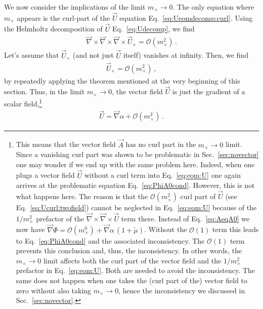 \documentclass[reprint, amsmath,amssymb, nofootinbib, aps, prd]{revtex4-2}
\begin{document}
We now consider the implications of the limit $m_\times \to 0$.
The only equation where $m_\times$ appears is the curl-part of the $\vec{U}$ equation Eq.~\eqref{eq:Ueomdecomp:curl}.
Using the Helmholtz decomposition of $\vec{U}$ Eq.~\eqref{eq:Udecomp}, we find
\begin{align}
 \vec{\nabla} \times \vec{\nabla} \times \vec{\nabla} \times \vec{U}_\times = \mathcal{O}(m_\times^2) \,.
\end{align}
Let's assume that $\vec{U}_\times$ (and not just $\vec{U}$ itself) vanishes at infinity.
Then, we find
\begin{align}
 \label{eq:Ucurl:twofield}
 \vec{U}_\times = \mathcal{O}(m_\times^2) \,,
\end{align}
by repeatedly applying the theorem mentioned at the very beginning of this section.
Thus, in the limit $m_\times \to 0$, the vector field $\vec{U}$ is just the gradient of a scalar field,\footnote{
  This means that the vector field $\vec{A}$ has no curl part in the $m_\times \to 0$ limit.
  Since a vanishing curl part was shown to be problematic in Sec.~\ref{sec:novector} one may wonder if we end up with the same problem here.
  Indeed, when one plugs a vector field $\vec{U}$ without a curl term into Eq.~\eqref{eq:eom:U} one again arrives at the problematic equation Eq.~\eqref{eq:PhiA0cond}.
  However, this is not what happens here.
  The reason is that the $\mathcal{O}(m_\times^2)$ curl part of $\vec{U}$ (see Eq.~\eqref{eq:Ucurl:twofield}) cannot be neglected in Eq.~\eqref{eq:eom:U} because of the $1/m_\times^2$ prefactor of the $\vec{\nabla} \times \vec{\nabla} \times \vec{U}$ term there.
  Instead of Eq.~\eqref{eq:AeqA0} we now have $\vec{\nabla} \Phi = \mathcal{O}(m_\times^0) + \vec{\nabla} \alpha \, (1 + \tilde{\mu})$.
  Without the $\mathcal{O}(1)$ term this leads to Eq.~\eqref{eq:PhiA0cond} and the associated inconsistency.
  The $\mathcal{O}(1)$ term prevents this conclusion and, thus, the inconsistency.
  In other words, the $m_\times \to 0$ limit affects both the curl part of the vector field and the $1/m_\times^2$ prefactor in Eq.~\eqref{eq:eom:U}.
  Both are needed to avoid the inconsistency.
  The same does not happen when one takes the (curl part of the) vector field to zero without also taking $m_\times \to 0$, hence the inconsistency we discussed in Sec.~\ref{sec:novector}.
}
\begin{align}
 \vec{U} = \vec{\nabla} \alpha + \mathcal{O}(m_\times^2) \,.
\end{align}
\end{document}
